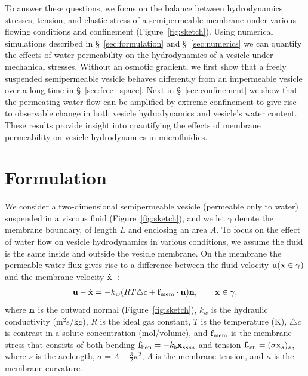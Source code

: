 \documentclass[prb,preprint,showpacs,preprintnumbers,amsmath,amssymb,longbibliography]{revtex4-1}
\begin{document}
To answer these
questions, we focus on the balance between hydrodynamics stresses,
tension, and elastic stress of a semipermeable membrane under various
flowing conditions and confinement (Figure~\ref{fig:sketch}).
%
Using numerical simulations described in \S~\ref{sec:formulation} and
\S~\ref{sec:numerics} we can quantify the effects of water permeability
on the hydrodynamics of a vesicle under mechanical stresses.  Without an
osmotic gradient, we first show that a freely suspended semipermeable
vesicle behaves differently from an impermeable vesicle over a long time
in \S~\ref{sec:free_space}. Next in \S~\ref{sec:confinement} we show
that
the permeating water flow can be amplified by extreme confinement to give rise to observable change in both  vesicle hydrodynamics and vesicle's water content. 
These results provide insight into quantifying the effects of membrane permeability on vesicle hydrodynamics in microfluidics.
%
 

\section{Formulation\label{sec:formulation}}
We consider a two-dimensional semipermeable vesicle (permeable only to
water) suspended in a viscous fluid (Figure~\ref{fig:sketch}), and we
let $\gamma$ denote the membrane boundary, of length $L$ and enclosing an area $A$.
%
%
To focus on the effect of water flow on vesicle
hydrodynamics in various conditions, we assume the fluid is the same
inside and outside the vesicle membrane. On the membrane the permeable
water flux gives rise to a difference between the fluid velocity
${\mathbf{u}}({\mathbf{x}}\in \gamma)$ and the membrane velocity
$\dot{\mathbf{x}}$~\cite{yao-mor2017}:
\begin{align}
\label{eqn:water_flux}
  \mathbf{u} - \dot{\mathbf{x}} = - k_w (R T \triangle c + \mathbf{f}_\mathrm{mem} \cdot \mathbf{n}) \mathbf{n}, \qquad
  \mathbf{x} \in \gamma,
\end{align}
where $\mathbf{n}$ is the outward normal (Figure~\ref{fig:sketch}), $k_w$ is
the hydraulic conductivity (m$^2$s/kg), $R$ is the ideal gas constant,
$T$ is the temperature (K), $\triangle c$ is contrast in a solute
concentration (mol/volume), and $\mathbf{f}_\mathrm{mem}$ is the membrane
stress that consists of both bending $ \mathbf{f}_\mathrm{ben}= -k_b
\mathbf{x}_{ssss}$ and tension $\mathbf{f}_\mathrm{ten}=(\sigma \mathbf{x}_s)_s$, where $s$
is the arclength, $\sigma = \Lambda - \frac{3}{2}\kappa^2$, $\Lambda$ is the
membrane tension, and $\kappa$ is the membrane curvature. 
\end{document}
